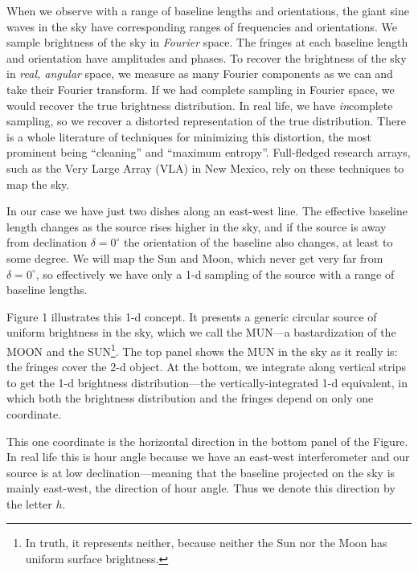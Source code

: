 \documentclass[11pt,preprint]{aastex}
\begin{document}
	When we observe with a range of baseline lengths and
orientations, the giant sine waves in the sky have corresponding ranges
of frequencies and orientations. We sample brightness of the sky in {\it
Fourier} space. The fringes at each baseline length and orientation have
amplitudes and phases. To recover the brightness of the sky in {\it
real, angular} space, we measure as many Fourier components as we can
and take their Fourier transform. If we had complete sampling in Fourier
space, we would recover the true brightness distribution. In real life,
we have {\it in}complete sampling, so we recover a distorted
representation of the true distribution. There is a whole literature 
of techniques for minimizing this distortion, the most prominent being
``cleaning'' and ``maximum entropy''. Full-fledged research arrays, such
as the Very Large Array (VLA) in New Mexico, rely on these techniques to
map the sky.

	In our case we have just two dishes along an east-west line. The
effective baseline length changes as the source rises higher in the sky,
and if the source is away from declination $\delta = 0^\circ$ the
orientation of the baseline also changes, at least to some degree. We
will map the Sun and Moon, which never get very far from $\delta =
0^\circ$, so effectively we have only a 1-d sampling of the source with
a range of baseline lengths. 

	Figure 1 illustrates this 1-d concept. It presents a generic
circular  source of uniform brightness in the sky, which we call the
MUN---a bastardization of the MOON and the SUN\footnote{In truth, it
represents neither, because neither the Sun nor the Moon has uniform
surface brightness.}. The top panel shows the MUN in the sky as it
really is: the fringes cover the 2-d object. At the bottom, we integrate
along vertical strips to get the 1-d brightness distribution---the
vertically-integrated 1-d equivalent, in which both the brightness
distribution and the fringes depend on only one coordinate. 

	This one coordinate is the horizontal direction in the bottom
panel of the Figure. In real life this is hour angle because we have an
east-west interferometer and our source is at low declination---meaning
that the baseline projected on the sky is mainly east-west, the
direction of hour angle. Thus we denote this direction by the letter
$h$. 
\end{document}
